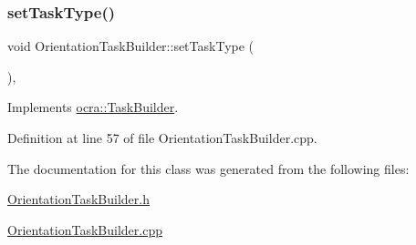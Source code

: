 \subsubsection{\texorpdfstring{set\+Task\+Type()}{setTaskType()}}
{\footnotesize\ttfamily void Orientation\+Task\+Builder\+::set\+Task\+Type (\begin{DoxyParamCaption}{ }\end{DoxyParamCaption})\hspace{0.3cm}{\ttfamily [protected]}, {\ttfamily [virtual]}}



Implements \hyperlink{classocra_1_1TaskBuilder_a1a979fc495be6dc30483aa8fd0ff2650}{ocra\+::\+Task\+Builder}.



Definition at line 57 of file Orientation\+Task\+Builder.\+cpp.



The documentation for this class was generated from the following files\+:\begin{DoxyCompactItemize}
\item 
\hyperlink{OrientationTaskBuilder_8h}{Orientation\+Task\+Builder.\+h}\item 
\hyperlink{OrientationTaskBuilder_8cpp}{Orientation\+Task\+Builder.\+cpp}\end{DoxyCompactItemize}
